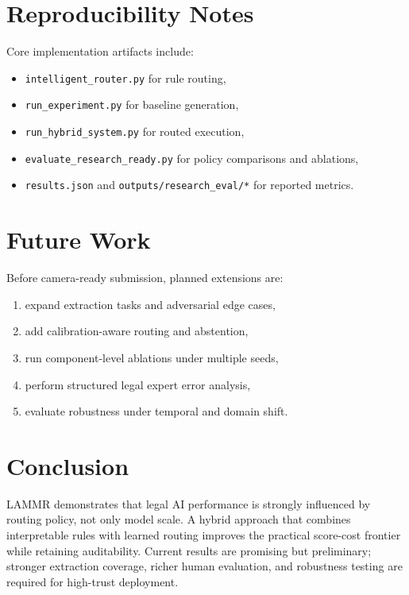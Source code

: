 \section{Reproducibility Notes}
Core implementation artifacts include:
\begin{itemize}[leftmargin=*]
  \item \texttt{intelligent\_router.py} for rule routing,
  \item \texttt{run\_experiment.py} for baseline generation,
  \item \texttt{run\_hybrid\_system.py} for routed execution,
  \item \texttt{evaluate\_research\_ready.py} for policy comparisons and ablations,
  \item \texttt{results.json} and \texttt{outputs/research\_eval/*} for reported metrics.
\end{itemize}

\section{Future Work}
Before camera-ready submission, planned extensions are:
\begin{enumerate}[leftmargin=*]
  \item expand extraction tasks and adversarial edge cases,
  \item add calibration-aware routing and abstention,
  \item run component-level ablations under multiple seeds,
  \item perform structured legal expert error analysis,
  \item evaluate robustness under temporal and domain shift.
\end{enumerate}

\section{Conclusion}
LAMMR demonstrates that legal AI performance is strongly influenced by routing policy, not only model scale. A hybrid approach that combines interpretable rules with learned routing improves the practical score-cost frontier while retaining auditability. Current results are promising but preliminary; stronger extraction coverage, richer human evaluation, and robustness testing are required for high-trust deployment.
